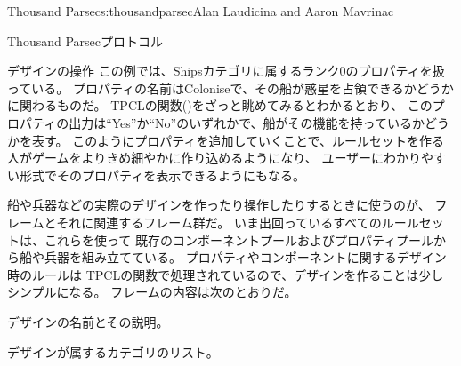 \begin{aosachapter}{Thousand Parsec}{s:thousandparsec}{Alan Laudicina and Aaron Mavrinac}
\begin{aosasect1}{Thousand Parsecプロトコル}
\begin{aosasect2}{デザインの操作}
この例では、Shipsカテゴリに属するランク0のプロパティを扱っている。
プロパティの名前はColoniseで、その船が惑星を占領できるかどうかに関わるものだ。
TPCLの関数()をざっと眺めてみるとわかるとおり、
このプロパティの出力は``Yes''か``No''のいずれかで、船がその機能を持っているかどうかを表す。
このようにプロパティを追加していくことで、ルールセットを作る人がゲームをよりきめ細やかに作り込めるようになり、
ユーザーにわかりやすい形式でそのプロパティを表示できるようにもなる。

船や兵器などの実際のデザインを作ったり操作したりするときに使うのが、
フレームとそれに関連するフレーム群だ。
いま出回っているすべてのルールセットは、これらを使って
既存のコンポーネントプールおよびプロパティプールから船や兵器を組み立てている。
プロパティやコンポーネントに関するデザイン時のルールは
TPCLの関数で処理されているので、デザインを作ることは少しシンプルになる。
フレームの内容は次のとおりだ。

\begin{aosaitemize}

  \item デザインの名前とその説明。

  \item デザインが属するカテゴリのリスト。


\end{aosaitemize}
\end{aosasect2}
\end{aosasect1}
\end{aosachapter}
